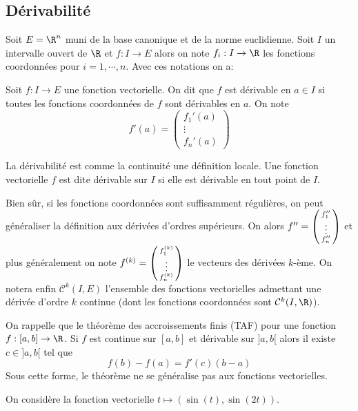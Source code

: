 \sld{\vfill\pagebreak[5]}%
\subsection{Dérivabilité}

Soit $E=\R^n$ muni de la base canonique et de la norme euclidienne. Soit $I$ un intervalle ouvert de $\R$ et $f:I\to E$ alors on note $f_i: I \to \R$ les fonctions coordonnées pour $i=1,\cdots,n$. Avec ces notations on a:
\begin{definition}[(dérivabilité)] 
	Soit $f:I\to E$ une fonction vectorielle. On dit que $f$ est dérivable en $a\in I$ si toutes les fonctions coordonnées de $f$ sont dérivables en $a$. On note
\[
	f'(a)= \begin{pmatrix}f_1'(a) \\ \vdots \\ f_n'(a)\end{pmatrix}
\]
\end{definition}
La dérivabilité est comme la continuité une définition locale. Une fonction vectorielle $f$ est dite dérivable sur $I$ si elle est dérivable en tout point de $I$.

\sld{\vfill\pagebreak[5]}%

Bien sûr, si les fonctions coordonnées sont suffisamment régulières, on peut généraliser la définition aux dérivées d'ordres supérieurs. On alors $f'' = \begin{psmallmatrix}
	f''_1\\ \vdots\\ f''_n
\end{psmallmatrix}$ et plus généralement on note $f^{(k)}= \begin{psmallmatrix}
	f^{(k)}_1\\ \vdots\\ f^{(k)}_n
\end{psmallmatrix}$ le vecteurs des dérivées $k$-ème. On notera enfin $\mathcal C^k(I, E)$ l'ensemble des fonctions vectorielles admettant une dérivée d'ordre $k$ continue (\ie dont les fonctions coordonnées sont $\mathcal C^k(I,\R)$).


\sld{\vfill\pagebreak[5]}%

On rappelle que le théorème des accroissements finis (TAF) pour une fonction $f:[a,b] \to \R$. Si $f$ est continue sur $[a,b]$ et dérivable sur $]a,b[$ alors il existe $c \in]a,b[$ tel que 
	\[f(b) - f(a) =  f'(c) (b-a) \]
Sous cette forme, le théorème ne se généralise pas aux fonctions vectorielles.
\begin{exemple}
 On considère la fonction vectorielle $t\mapsto (\sin(t) , \sin(2t))$.	
 \pl{\rep{4cm}}
\end{exemple}

